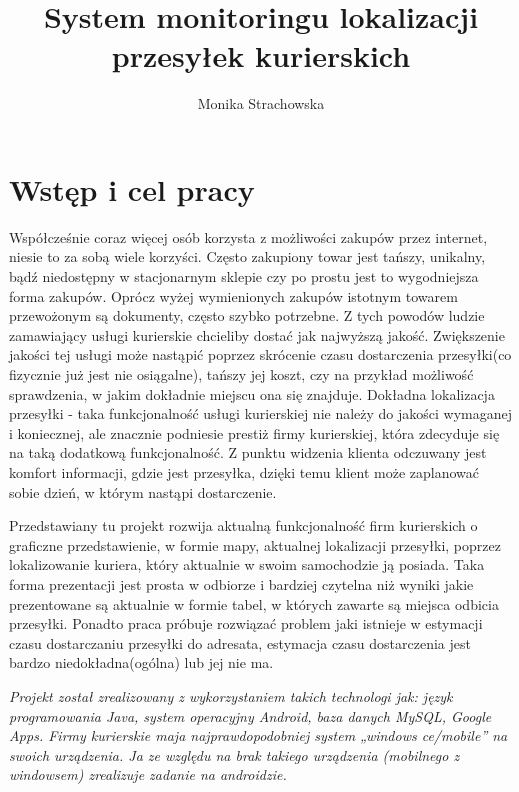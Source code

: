 \documentclass[eng,printmode,oneside]{mgr}
\title{System monitoringu lokalizacji przesyłek kurierskich}
\author{Monika Strachowska}
\begin{document}

\maketitle %


\tableofcontents %

\chapter{Wstęp i cel pracy}

Współcześnie coraz więcej osób korzysta z możliwości zakupów przez internet,
niesie to za sobą wiele korzyści. Często zakupiony towar jest tańszy, unikalny,
bądź niedostępny w stacjonarnym sklepie czy po prostu jest to wygodniejsza forma
zakupów. Oprócz wyżej wymienionych zakupów istotnym towarem przewożonym
są dokumenty, często szybko potrzebne. Z tych powodów ludzie zamawiający usługi 
kurierskie chcieliby dostać jak najwyższą jakość. Zwiększenie jakości tej
usługi może nastąpić poprzez skrócenie czasu dostarczenia przesyłki(co
fizycznie już jest nie osiągalne), tańszy jej koszt, czy na przykład możliwość
sprawdzenia, w jakim dokładnie miejscu ona się znajduje. Dokładna lokalizacja
przesyłki - taka funkcjonalność usługi kurierskiej nie należy do jakości
wymaganej i koniecznej, ale znacznie podniesie prestiż firmy
kurierskiej, która zdecyduje się na taką dodatkową funkcjonalność. Z punktu
widzenia klienta odczuwany jest komfort informacji, gdzie jest przesyłka, dzięki
temu klient może zaplanować sobie dzień, w którym nastąpi dostarczenie. 

Przedstawiany tu projekt rozwija aktualną funkcjonalność firm kurierskich o
graficzne przedstawienie, w formie mapy, aktualnej lokalizacji przesyłki,
poprzez lokalizowanie kuriera, który aktualnie w swoim samochodzie ją posiada.
Taka forma prezentacji jest prosta w odbiorze i bardziej czytelna niż wyniki
jakie prezentowane są aktualnie w formie tabel, w których zawarte są miejsca
odbicia przesyłki. Ponadto praca próbuje rozwiązać problem jaki istnieje w
estymacji czasu dostarczaniu przesyłki do adresata, estymacja czasu
dostarczenia jest bardzo niedokładna(ogólna) lub jej nie ma.

\emph{\color{komentarz}
Projekt został zrealizowany z wykorzystaniem takich
technologi jak:
język programowania Java, system operacyjny Android, baza danych MySQL, Google Apps.
Firmy kurierskie maja najprawdopodobniej system „windows ce/mobile” na swoich urządzenia. Ja ze względu na brak takiego urządzenia (mobilnego z windowsem) 
zrealizuje zadanie na androidzie.
}
\end{document}
